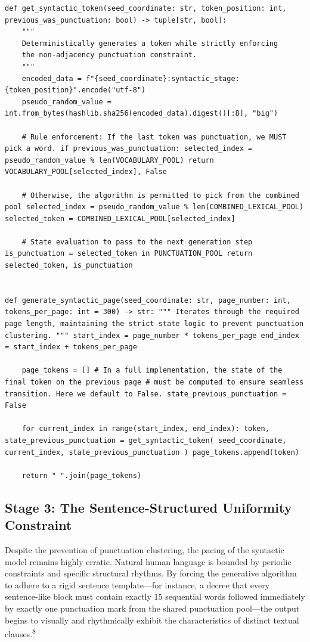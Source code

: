 \documentclass[
  11pt,
  a4paper,
]{article}
\begin{document}
\begin{lstlisting}[style=babelpython]
def get_syntactic_token(seed_coordinate: str, token_position: int, previous_was_punctuation: bool) -> tuple[str, bool]:
    """
    Deterministically generates a token while strictly enforcing
    the non-adjacency punctuation constraint.
    """
    encoded_data = f"{seed_coordinate}:syntactic_stage:{token_position}".encode("utf-8")
    pseudo_random_value = int.from_bytes(hashlib.sha256(encoded_data).digest()[:8], "big")

    # Rule enforcement: If the last token was punctuation, we MUST pick a word. if previous_was_punctuation: selected_index = pseudo_random_value % len(VOCABULARY_POOL) return VOCABULARY_POOL[selected_index], False

    # Otherwise, the algorithm is permitted to pick from the combined pool selected_index = pseudo_random_value % len(COMBINED_LEXICAL_POOL) selected_token = COMBINED_LEXICAL_POOL[selected_index]

    # State evaluation to pass to the next generation step is_punctuation = selected_token in PUNCTUATION_POOL return selected_token, is_punctuation


def generate_syntactic_page(seed_coordinate: str, page_number: int, tokens_per_page: int = 300) -> str: """ Iterates through the required page length, maintaining the strict state logic to prevent punctuation clustering. """ start_index = page_number * tokens_per_page end_index = start_index + tokens_per_page

    page_tokens = [] # In a full implementation, the state of the final token on the previous page # must be computed to ensure seamless transition. Here we default to False. state_previous_punctuation = False

    for current_index in range(start_index, end_index): token, state_previous_punctuation = get_syntactic_token( seed_coordinate, current_index, state_previous_punctuation ) page_tokens.append(token)

    return " ".join(page_tokens) \end{lstlisting}

\subsection{Stage 3: The Sentence-Structured Uniformity Constraint}\label{stage-3-the-sentence-structured-uniformity-constraint}

Despite the prevention of punctuation clustering, the pacing of the syntactic model remains highly erratic. Natural human language is bounded by periodic constraints and specific structural rhythms. By forcing the generative algorithm to adhere to a rigid sentence template---for instance, a decree that every sentence-like block must contain exactly 15 sequential words followed immediately by exactly one punctuation mark from the shared punctuation pool---the output begins to visually and rhythmically exhibit the characteristics of distinct textual clauses.\textsuperscript{8}
\end{document}
